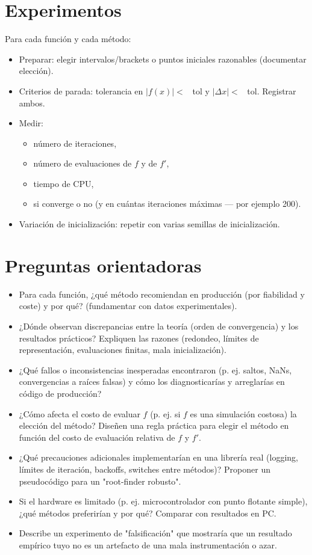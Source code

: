 \documentclass[spanish,10pt,letterpaper]{article}
\begin{document}
\section{Experimentos}
Para cada función y cada método:
\begin{itemize}
	\item Preparar: elegir intervalos/brackets o puntos iniciales razonables (documentar elección).
	\item Criterios de parada: tolerancia en $|f(x)|<$~ tol y $|\Delta x|<$~ tol. Registrar ambos.
	\item Medir:
	\begin{itemize}
		\item número de iteraciones,
		\item número de evaluaciones de $f$ y de $f'$,
		\item tiempo de CPU,
		\item si converge o no (y en cuántas iteraciones máximas — por ejemplo 200).
	\end{itemize}
	\item Variación de inicialización: repetir con varias semillas de inicialización.
\end{itemize}


\section{Preguntas orientadoras}
\begin{itemize}
	\item Para cada función, ¿qué método recomiendan en producción (por fiabilidad y coste) y por qué? (fundamentar con datos experimentales).

	\item ¿Dónde observan discrepancias entre la teoría (orden de convergencia) y los resultados prácticos? Expliquen las razones (redondeo, límites de representación, evaluaciones finitas, mala inicialización).
	
	\item ¿Qué fallos o inconsistencias inesperadas encontraron (p. ej. saltos, NaNs, convergencias a raíces falsas) y cómo los diagnosticarías y arreglarías en código de producción?
	
	\item ¿Cómo afecta el costo de evaluar $f$ (p. ej. si $f$ es una simulación costosa) la elección del método? Diseñen una regla práctica para elegir el método en función del costo de evaluación relativa de $f$ y $f'$.
	
	\item ¿Qué precauciones adicionales implementarían en una librería real (logging, límites de iteración, backoffs, switches entre métodos)? Proponer un pseudocódigo para un "root-finder robusto".
	
	\item  Si el hardware es limitado (p. ej. microcontrolador con punto flotante simple), ¿qué métodos preferirían y por qué? Comparar con resultados en PC.
	
	\item Describe un experimento de "falsificación" que mostraría que un resultado empírico tuyo no es un artefacto de una mala instrumentación o azar.
\end{itemize}
\end{document}
